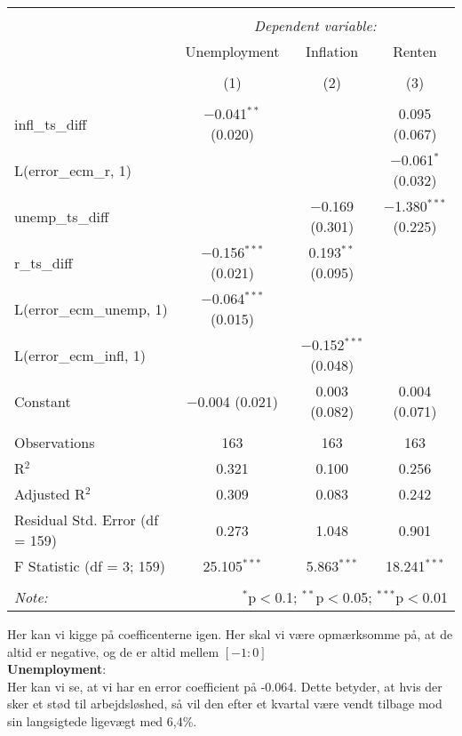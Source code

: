 \documentclass[
  10pt,
]{article}
\begin{document}
\begin{table}[!htbp] \centering 
  \caption{} 
  \label{} 
\begin{tabular}{@{\extracolsep{5pt}}lccc} 
\\[-1.8ex]\hline 
\hline \\[-1.8ex] 
 & \multicolumn{3}{c}{\textit{Dependent variable:}} \\ 
\cline{2-4} 
 & Unemployment & Inflation & Renten \\ 
\\[-1.8ex] & (1) & (2) & (3)\\ 
\hline \\[-1.8ex] 
 infl\_ts\_diff & $-$0.041$^{**}$ (0.020) &  & 0.095 (0.067) \\ 
  L(error\_ecm\_r, 1) &  &  & $-$0.061$^{*}$ (0.032) \\ 
  unemp\_ts\_diff &  & $-$0.169 (0.301) & $-$1.380$^{***}$ (0.225) \\ 
  r\_ts\_diff & $-$0.156$^{***}$ (0.021) & 0.193$^{**}$ (0.095) &  \\ 
  L(error\_ecm\_unemp, 1) & $-$0.064$^{***}$ (0.015) &  &  \\ 
  L(error\_ecm\_infl, 1) &  & $-$0.152$^{***}$ (0.048) &  \\ 
  Constant & $-$0.004 (0.021) & 0.003 (0.082) & 0.004 (0.071) \\ 
 \hline \\[-1.8ex] 
Observations & 163 & 163 & 163 \\ 
R$^{2}$ & 0.321 & 0.100 & 0.256 \\ 
Adjusted R$^{2}$ & 0.309 & 0.083 & 0.242 \\ 
Residual Std. Error (df = 159) & 0.273 & 1.048 & 0.901 \\ 
F Statistic (df = 3; 159) & 25.105$^{***}$ & 5.863$^{***}$ & 18.241$^{***}$ \\ 
\hline 
\hline \\[-1.8ex] 
\textit{Note:}  & \multicolumn{3}{r}{$^{*}$p$<$0.1; $^{**}$p$<$0.05; $^{***}$p$<$0.01} \\ 
\end{tabular} 
\end{table}

Her kan vi kigge på coefficenterne igen. Her skal vi være opmærksomme
på, at de altid er negative, og de er altid mellem \([-1:0]\)\\

\textbf{Unemployment}:\\
Her kan vi se, at vi har en error coefficient på -0.064. Dette betyder,
at hvis der sker et stød til arbejdsløshed, så vil den efter et kvartal
være vendt tilbage mod sin langsigtede ligevægt med 6,4\%.\\
\end{document}
